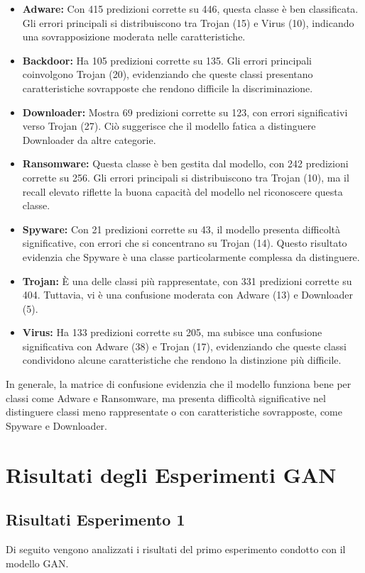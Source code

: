 \begin{itemize}
    \item \textbf{Adware:} Con 415 predizioni corrette su 446, questa classe è ben classificata. Gli errori principali si distribuiscono tra Trojan (15) e Virus (10), indicando una sovrapposizione moderata nelle caratteristiche.
    \item \textbf{Backdoor:} Ha 105 predizioni corrette su 135. Gli errori principali coinvolgono Trojan (20), evidenziando che queste classi presentano caratteristiche sovrapposte che rendono difficile la discriminazione.
    \item \textbf{Downloader:} Mostra 69 predizioni corrette su 123, con errori significativi verso Trojan (27). Ciò suggerisce che il modello fatica a distinguere Downloader da altre categorie.
    \item \textbf{Ransomware:} Questa classe è ben gestita dal modello, con 242 predizioni corrette su 256. Gli errori principali si distribuiscono tra Trojan (10), ma il recall elevato riflette la buona capacità del modello nel riconoscere questa classe.
    \item \textbf{Spyware:} Con 21 predizioni corrette su 43, il modello presenta difficoltà significative, con errori che si concentrano su Trojan (14). Questo risultato evidenzia che Spyware è una classe particolarmente complessa da distinguere.
    \item \textbf{Trojan:} È una delle classi più rappresentate, con 331 predizioni corrette su 404. Tuttavia, vi è una confusione moderata con Adware (13) e Downloader (5).
    \item \textbf{Virus:} Ha 133 predizioni corrette su 205, ma subisce una confusione significativa con Adware (38) e Trojan (17), evidenziando che queste classi condividono alcune caratteristiche che rendono la distinzione più difficile.
\end{itemize}
In generale, la matrice di confusione evidenzia che il modello funziona bene per classi come Adware e Ransomware, ma presenta difficoltà significative nel distinguere classi meno rappresentate o con caratteristiche sovrapposte, come Spyware e Downloader.


\section{Risultati degli Esperimenti GAN}
\subsection{Risultati Esperimento 1}
Di seguito vengono analizzati i risultati del primo esperimento condotto con il modello GAN.
